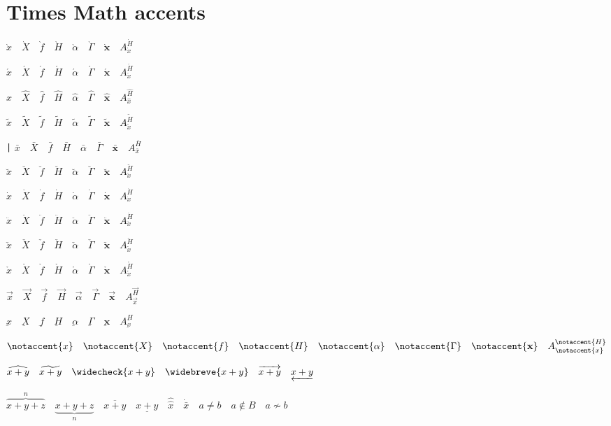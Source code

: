\documentclass{article}
\newcommand{\accentrow}[1]{%
  \texttt{\string#1}\quad
  $#1{x}\quad #1{X}\quad #1{f}\quad #1{H}\quad
   #1{\alpha}\quad #1{\Gamma}\quad #1{\mathbf{x}}\quad
   A_{#1{x}}^{#1{H}}$\par\medskip}
\begin{document}
\section*{Times Math accents}
\accentrow{\grave}
\accentrow{\acute}
\accentrow{\hat}
\accentrow{\tilde}
\accentrow{\bar}
\accentrow{\breve}
\accentrow{\dot}
\accentrow{\ddot}
\accentrow{\check}
\accentrow{\mathring}
\accentrow{\vec}
\accentrow{\underbar}
\accentrow{\notaccent}
\medskip
$\widehat{x+y}\quad \widetilde{x+y}\quad \widecheck{x+y}\quad
 \widebreve{x+y}\quad \overrightarrow{x+y}\quad \underleftarrow{x+y}$
\par\medskip
$\overbrace{x+y+z}^{n}\quad \underbrace{x+y+z}_{n}\quad
 \overline{x+y}\quad \underline{x+y}\quad
 \hat{\hat{x}}\quad \dot{\bar{x}}\quad
 a\not=b\quad a\notin B\quad a\not\sim b$
\end{document}

